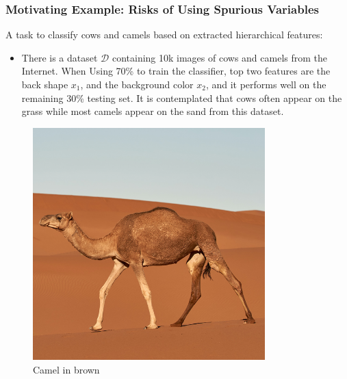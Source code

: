 \begin{frame}
  \frametitle{Motivating Example: Risks of Using Spurious Variables}
   A task to classify cows and camels based on extracted hierarchical features: 
  \begin{itemize}
  \item There is a dataset $\mathcal D$ containing 10k images of cows and camels from the Internet. When Using 70\% to train the classifier, top two features are the back shape $x_1$, and the background color $x_2$, and it performs well on the remaining 30\% testing set. It is contemplated that cows often appear on the grass while most camels appear on the sand from this dataset.
  \end{itemize}
  \vspace{6pt}
  \centering
  \begin{minipage}{.3\textwidth}
    \begin{figure}[H]
      \centering \includegraphics[width=0.8\textwidth]{figs/camel_sand.png}
      \caption{Camel in brown}
    \end{figure}
  \end{minipage}%
  \begin{minipage}{.3\textwidth}
    \begin{figure}[H]

\end{figure}
\end{minipage}
\end{frame}
